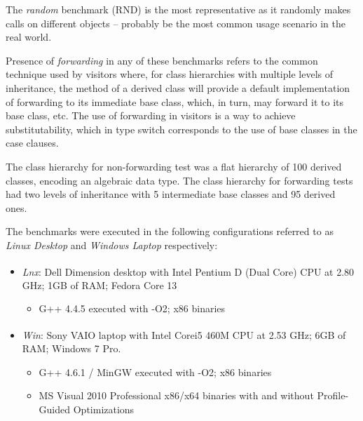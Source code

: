 The \emph{random} benchmark (RND) is the most representative as it randomly makes calls on 
different objects -- probably be the most common usage scenario in the real world.

Presence of \emph{forwarding} in any of these benchmarks refers to the 
common technique used by visitors where, for class hierarchies with multiple 
levels of inheritance, the  method of a derived class will provide a 
default implementation of forwarding to its immediate base class, which, in turn, 
may forward it to its base class, etc. The use of forwarding in visitors is a 
way to achieve substitutability, which in type switch corresponds to the use 
of base classes in the case clauses.

The class hierarchy for non-forwarding test was a flat hierarchy of 100 
derived classes, encoding an algebraic data type. The class hierarchy for 
forwarding tests had two levels of inheritance with 5 intermediate base classes 
and 95 derived ones. 

The benchmarks were executed in the following configurations referred to as 
\emph{Linux Desktop} and \emph{Windows Laptop} respectively:

\begin{itemize}
\setlength{\itemsep}{0pt}
\setlength{\parskip}{0pt}
\item \emph{Lnx}: Dell Dimension\textsuperscript{\textregistered} desktop with Intel\textsuperscript{\textregistered} Pentium\textsuperscript{\textregistered} 
      D (Dual Core) CPU at 2.80 GHz; 1GB of RAM; Fedora Core 13  
      \begin{itemize}
      \setlength{\itemsep}{0pt}
      \setlength{\parskip}{0pt}
      \item G++ 4.4.5 executed with -O2; x86 binaries
      \end{itemize}
\item \emph{Win}: Sony VAIO\textsuperscript{\textregistered} laptop with Intel\textsuperscript{\textregistered} Core\texttrademark i5 460M 
      CPU at 2.53 GHz; 6GB of RAM; Windows 7 Pro.
      \begin{itemize}
      \setlength{\itemsep}{0pt}
      \setlength{\parskip}{0pt}
      \item G++ 4.6.1 / MinGW executed with -O2; x86 binaries
      \item MS Visual \Cpp{} 2010 Professional x86/x64 binaries with and without 
      Profile-Guided Optimizations
      \end{itemize}
\end{itemize}

